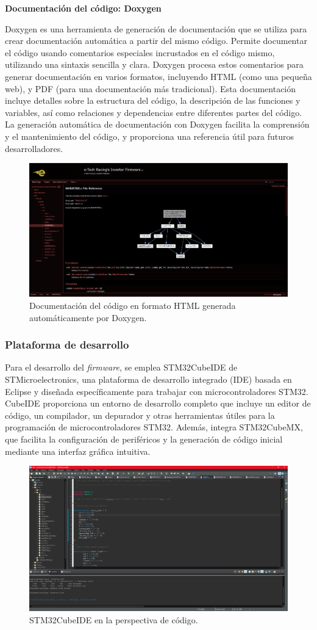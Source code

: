 \textbf{Documentación del código: Doxygen}

Doxygen es una herramienta de generación de documentación que se utiliza para crear documentación automática a partir del mismo código. Permite documentar el código usando comentarios especiales incrustados en el código mismo, utilizando una sintaxis sencilla y clara. Doxygen procesa estos comentarios para generar documentación en varios formatos, incluyendo HTML (como una pequeña web), y PDF (para una documentación más tradicional). Esta documentación incluye detalles sobre la estructura del código, la descripción de las funciones y variables, así como relaciones y dependencias entre diferentes partes del código. La generación automática de documentación con Doxygen facilita la comprensión y el mantenimiento del código, y proporciona una referencia útil para futuros desarrolladores.

\begin{figure}[H]
	\centering
	\includegraphics[width=0.7\linewidth]{fig/doxyhtml}
	\caption{Documentación del código en formato HTML generada automáticamente por Doxygen.}
	\label{fig:doxyhtml}
\end{figure}


\subsubsection{Plataforma de desarrollo}
Para el desarrollo del \textit{firmware}, se emplea STM32CubeIDE de STMicroelectronics, una plataforma de desarrollo integrado (IDE) basada en Eclipse y diseñada específicamente para trabajar con microcontroladores STM32. CubeIDE proporciona un entorno de desarrollo completo que incluye un editor de código, un compilador, un depurador y otras herramientas útiles para la programación de microcontroladores STM32. Además, integra STM32CubeMX, que facilita la configuración de periféricos y la generación de código inicial mediante una interfaz gráfica intuitiva.

\begin{figure}
	\centering
	\includegraphics[width=0.7\linewidth]{fig/cubeide_code}
	\caption{STM32CubeIDE en la perspectiva de código.}
\end{figure}


